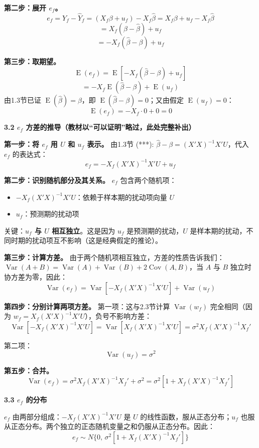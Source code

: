 \documentclass[12pt,a4paper]{ctexart}
\DeclareMathOperator{\Var}{Var}
\DeclareMathOperator{\Cov}{Cov}
\DeclareMathOperator{\E}{E}
\begin{document}
\noindent\textbf{第二步：展开 $e_f$。}
\[
e_f = Y_f - \hat{Y}_f = (X_f\beta + u_f) - X_f\hat{\beta} = X_f\beta + u_f - X_f\hat{\beta}
\]
\[
= X_f(\beta - \hat{\beta}) + u_f
\]
\[
= -X_f(\hat{\beta} - \beta) + u_f
\]

\noindent\textbf{第三步：取期望。}
\[
\E(e_f) = \E[-X_f(\hat{\beta}-\beta) + u_f]
\]
\[
= -X_f \E(\hat{\beta}-\beta) + \E(u_f)
\]
由1.3节已证 $\E(\hat{\beta}) = \beta$，即 $\E(\hat{\beta}-\beta) = 0$；又由假定 $\E(u_f) = 0$：
\begin{equation}
\E(e_f) = -X_f \cdot 0 + 0 = 0 \tag{3.63}
\end{equation}

\textbf{3.2 $e_f$ 方差的推导（教材以“可以证明”略过，此处完整补出）}

\noindent\textbf{第一步：将 $e_f$ 用 $U$ 和 $u_f$ 表示。}
由1.3节 (***): $\hat{\beta}-\beta = (X'X)^{-1}X'U$，代入 $e_f$ 的表达式：
\[
e_f = -X_f(X'X)^{-1}X'U + u_f
\]

\noindent\textbf{第二步：识别随机部分及其关系。}
$e_f$ 包含两个随机项：
\begin{itemize}
\item $-X_f(X'X)^{-1}X'U$：依赖于样本期的扰动项向量 $U$
\item $u_f$：预测期的扰动项
\end{itemize}
关键：\textbf{$u_f$ 与 $U$ 相互独立}。这是因为 $u_f$ 是预测期的扰动，$U$ 是样本期的扰动，不同时期的扰动项互不影响（这是经典假定的推论）。

\noindent\textbf{第三步：计算方差。}
由于两个随机项相互独立，方差的性质告诉我们：$\Var(A + B) = \Var(A) + \Var(B) + 2\Cov(A,B)$，当 $A$ 与 $B$ 独立时协方差为零，因此：
\[
\Var(e_f) = \Var[-X_f(X'X)^{-1}X'U] + \Var(u_f)
\]

\noindent\textbf{第四步：分别计算两项方差。}
第一项：这与2.3节计算 $\Var(w_f)$ 完全相同（因为 $w_f = X_f(X'X)^{-1}X'U$），负号不影响方差：
\[
\Var[-X_f(X'X)^{-1}X'U] = \Var[X_f(X'X)^{-1}X'U] = \sigma^2 X_f(X'X)^{-1}X_f'
\]

第二项：
\[
\Var(u_f) = \sigma^2
\]

\noindent\textbf{第五步：合并。}
\[
\Var(e_f) = \sigma^2 X_f(X'X)^{-1}X_f' + \sigma^2 = \sigma^2[1 + X_f(X'X)^{-1}X_f']
\]

\textbf{3.3 $e_f$ 的分布}

$e_f$ 由两部分组成：$-X_f(X'X)^{-1}X'U$ 是 $U$ 的线性函数，服从正态分布；$u_f$ 也服从正态分布。两个独立的正态随机变量之和仍服从正态分布。因此：
\begin{equation}
e_f \sim N\{0,\, \sigma^2[1 + X_f(X'X)^{-1}X_f']\} \tag{3.64}
\end{equation}
\end{document}
